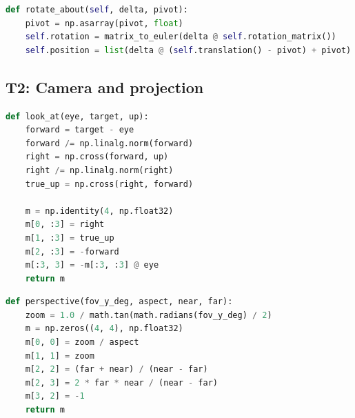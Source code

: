 \documentclass[9pt,twocolumn,a4paper]{extarticle}
\newcommand{\code}[1]{\texttt{#1}}
\begin{document}
\begin{minipage}{\linewidth}
\begin{lstlisting}[language=Python,caption={\code{core/transform.py}, \code{Transform.rotate\_about}},label={lst:pivot}]
def rotate_about(self, delta, pivot):
    pivot = np.asarray(pivot, float)
    self.rotation = matrix_to_euler(delta @ self.rotation_matrix())
    self.position = list(delta @ (self.translation() - pivot) + pivot)
\end{lstlisting}
\end{minipage}
\par\vspace{4pt}


\subsection{T2: Camera and projection}
\begin{minipage}{\linewidth}
\begin{lstlisting}[language=Python,caption={\code{core/math3d.py}, \code{look\_at}: view matrix $\mathbf{V}$},label={lst:lookat}]
def look_at(eye, target, up):
    forward = target - eye
    forward /= np.linalg.norm(forward)
    right = np.cross(forward, up)
    right /= np.linalg.norm(right)
    true_up = np.cross(right, forward)

    m = np.identity(4, np.float32)
    m[0, :3] = right
    m[1, :3] = true_up
    m[2, :3] = -forward
    m[:3, 3] = -m[:3, :3] @ eye
    return m
\end{lstlisting}
\end{minipage}
\par\vspace{4pt}

\begin{minipage}{\linewidth}
\begin{lstlisting}[language=Python,caption={\code{core/math3d.py}, \code{perspective}: projection matrix $\mathbf{P}$},label={lst:persp}]
def perspective(fov_y_deg, aspect, near, far):
    zoom = 1.0 / math.tan(math.radians(fov_y_deg) / 2)
    m = np.zeros((4, 4), np.float32)
    m[0, 0] = zoom / aspect
    m[1, 1] = zoom
    m[2, 2] = (far + near) / (near - far)
    m[2, 3] = 2 * far * near / (near - far)
    m[3, 2] = -1
    return m
\end{lstlisting}
\end{minipage}
\par\vspace{4pt}
\end{document}
